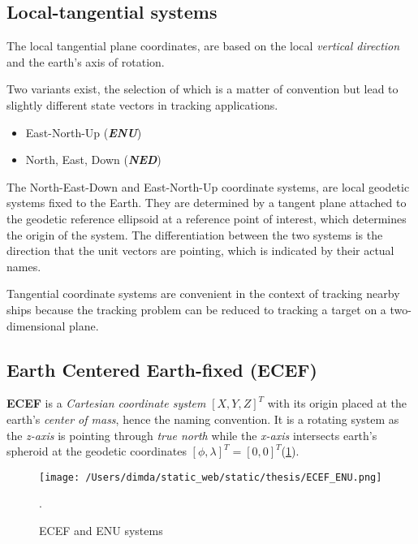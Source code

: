 \subsection{Local-tangential systems}

The local tangential plane coordinates, are based on the local \textit{vertical direction} and the earth's axis of rotation.

Two variants exist, the selection of which is a matter of convention but lead to slightly different state vectors in tracking applications.



\begin{itemize}
	\item East-North-Up (\textbf{\textit{ENU}})
	\item North, East, Down (\textbf{\textit{NED}})
\end{itemize}

The North-East-Down and East-North-Up coordinate systems, are local geodetic systems fixed to the Earth. They are determined by a tangent plane attached to the geodetic reference ellipsoid at a reference point of interest, which determines the origin of the system. The differentiation between the two systems is the direction that the unit vectors are pointing, which is indicated by their actual names.


Tangential coordinate systems are convenient in the context of tracking nearby ships because the tracking problem can be reduced to tracking a target on a two-dimensional plane.


\subsection{Earth Centered Earth-fixed (ECEF)}

\textbf{ECEF} is a \textit{Cartesian coordinate system} $[X,Y,Z]^T$ with its origin placed at the earth's \textit{center of mass}, hence the naming convention. It is a rotating system as the \textit{z-axis} is pointing through \textit{true north} while the \textit{x-axis} intersects earth's spheroid at the geodetic coordinates $[\phi,\lambda]^{T} =  [0,0]^{T}$(\cref{fig:ECEF_ENU}).


\begin{figure}[H]
	\centering
	\texttt{[image: /Users/dimda/static\_web/static/thesis/ECEF\_ENU.png]}
	\caption{ECEF and ENU systems \cite{WikipediaENUFig}}.
\label{fig:ECEF_ENU}
\end{figure}


